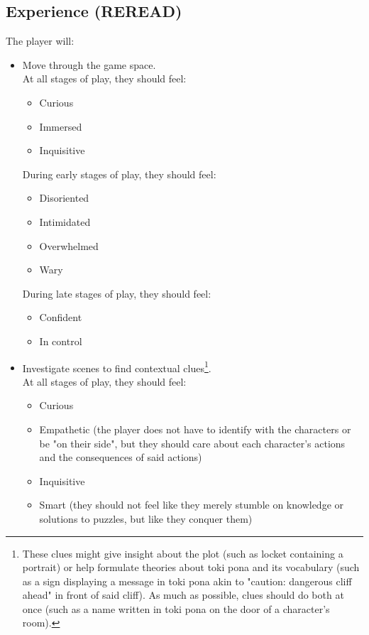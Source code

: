 \documentclass{scrartcl}
\begin{document}
		\subsection{Experience (REREAD)}
			The player will:
			\begin{itemize}
				\item Move through the game space. \\
				At all stages of play, they should feel:
				\begin{itemize}
					\item Curious
					\item Immersed
					\item Inquisitive
				\end{itemize}
				During early stages of play, they should feel: 
				\begin{itemize}
					\item Disoriented
					\item Intimidated
					\item Overwhelmed
					\item Wary
				\end{itemize}
				During late stages of play, they should feel:
				\begin{itemize}
					\item Confident
					\item In control
				\end{itemize}
				\item Investigate scenes to find contextual clues\footnote{These clues might give insight about the plot (such as locket containing a portrait) or help formulate theories about toki pona and its vocabulary (such as a sign displaying a message in toki pona akin to "caution: dangerous cliff ahead" in front of said cliff). As much as possible, clues should do both at once (such as a name written in toki pona on the door of a character's room).}.\\
				At all stages of play, they should feel:
				\begin{itemize}
					\item Curious
					\item Empathetic (the player does not have to identify with the characters or be "on their side", but they should care about each character's actions and the consequences of said actions)
					\item Inquisitive
					\item Smart (they should not feel like they merely stumble on knowledge or solutions to puzzles, but like they conquer them)

\end{itemize}
\end{itemize}
\end{document}
